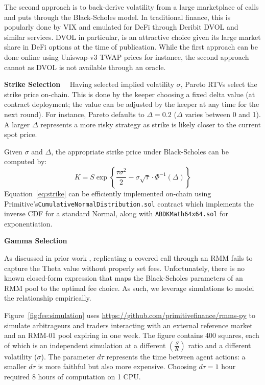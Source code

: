 \documentclass[hidelinks, 12pt]{article}
\begin{document}
The second approach is to back-derive volatility from a large marketplace of calls and puts through the Black-Scholes model. 
In traditional finance, this is popularly done by VIX and emulated for DeFi through Deribit DVOL and similar services.
DVOL in particular, is an attractive choice given its large market share in DeFi options at the time of publication.
While the first approach can be done online using Uniswap-v3 TWAP prices for instance, the second approach cannot as DVOL is not available through an oracle. 

\textbf{Strike Selection}$\quad$ Having selected implied volatility $\sigma$, Pareto RTVs select the strike price on-chain. 
This is done by the keeper choosing a fixed delta value (at contract deployment; the value can be adjusted by the keeper at any time for the next round). For instance, Pareto defaults to $\Delta = 0.2$ ($\Delta$ varies between 0 and 1). 
A larger $\Delta$  represents a more risky strategy as strike is likely closer to the current spot price. 

Given $\sigma$ and $\Delta$, the appropriate strike price under Black-Scholes can be computed by: 
\begin{equation}
  K = S \exp \left\{ \frac{\tau \sigma^2}{2} - \sigma \sqrt{\tau} \cdot \Phi^{-1}(\Delta) \right\}
  \label{eq:strike}
\end{equation}
Equation~\ref{eq:strike} can be efficiently implemented on-chain using Primitive's\newline \texttt{CumulativeNormalDistribution.sol} contract which implements the inverse CDF for a standard Normal, along with \texttt{ABDKMath64x64.sol} for exponentiation.

\textbf{Gamma Selection}$\quad$

As discussed in prior work \cite{angeris2021replicating}, replicating a covered call through an RMM fails to capture the Theta value without properly set fees.
Unfortunately, there is no known closed-form expression that maps the Black-Scholes parameters of an RMM pool to the optimal fee choice.
As such, we leverage simulations to model the relationship empirically.

Figure~\ref{fig:fee:simulation} uses \url{https://github.com/primitivefinance/rmms-py} to simulate arbitrageurs and traders interacting with an external reference market and an RMM-01 pool expiring in one week. The figure contains 400 squares, each of which is an independent simulation at a different $\left(\frac{S}{K}\right)$ ratio and a different volatility ($\sigma$). The parameter $d\tau$ represents the time between agent actions: a smaller $d\tau$ is more faithful but also more expensive. Choosing $d\tau = 1$ hour required 8 hours of computation on 1 CPU.
\end{document}
